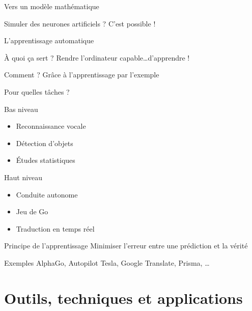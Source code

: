 \documentclass{beamer}
\begin{document}
\begin{frame}{Vers un modèle mathématique}  

Simuler des neurones artificiels ? C'est possible !

\end{frame}

\begin{frame}{L'apprentissage automatique}
\begin{block}{À quoi ça sert ?}
Rendre l'ordinateur capable\dots  d'apprendre !
\end{block}

\begin{block}{Comment ?}
Grâce à l'apprentissage par l'exemple
\end{block}
\end{frame}

\begin{frame}{Pour quelles tâches ?}
\begin{block}{Bas niveau}
\begin{itemize}
	\item Reconnaissance vocale
    \item Détection d'objets
    \item Études statistiques
\end{itemize}
\end{block}

\begin{block}{Haut niveau}
\begin{itemize}
	\item Conduite autonome
    \item Jeu de Go
    \item Traduction en temps réel
\end{itemize}
\end{block}

\end{frame}

\begin{frame}{Principe de l'apprentissage}
Minimiser l'erreur entre une prédiction et la vérité
\end{frame}

\begin{frame}{Exemples}
AlphaGo, Autopilot Tesla, Google Translate, Prisma, \dots
\end{frame}

\section{Outils, techniques et applications}
\end{document}
